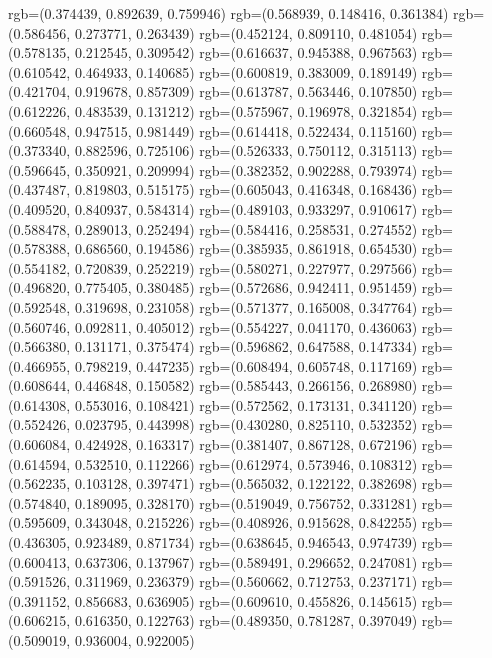 {{{					rgb=(0.374439, 0.892639, 0.759946)
					rgb=(0.568939, 0.148416, 0.361384)
					rgb=(0.586456, 0.273771, 0.263439)
					rgb=(0.452124, 0.809110, 0.481054)
					rgb=(0.578135, 0.212545, 0.309542)
					rgb=(0.616637, 0.945388, 0.967563)
					rgb=(0.610542, 0.464933, 0.140685)
					rgb=(0.600819, 0.383009, 0.189149)
					rgb=(0.421704, 0.919678, 0.857309)
					rgb=(0.613787, 0.563446, 0.107850)
					rgb=(0.612226, 0.483539, 0.131212)
					rgb=(0.575967, 0.196978, 0.321854)
					rgb=(0.660548, 0.947515, 0.981449)
					rgb=(0.614418, 0.522434, 0.115160)
					rgb=(0.373340, 0.882596, 0.725106)
					rgb=(0.526333, 0.750112, 0.315113)
					rgb=(0.596645, 0.350921, 0.209994)
					rgb=(0.382352, 0.902288, 0.793974)
					rgb=(0.437487, 0.819803, 0.515175)
					rgb=(0.605043, 0.416348, 0.168436)
					rgb=(0.409520, 0.840937, 0.584314)
					rgb=(0.489103, 0.933297, 0.910617)
					rgb=(0.588478, 0.289013, 0.252494)
					rgb=(0.584416, 0.258531, 0.274552)
					rgb=(0.578388, 0.686560, 0.194586)
					rgb=(0.385935, 0.861918, 0.654530)
					rgb=(0.554182, 0.720839, 0.252219)
					rgb=(0.580271, 0.227977, 0.297566)
					rgb=(0.496820, 0.775405, 0.380485)
					rgb=(0.572686, 0.942411, 0.951459)
					rgb=(0.592548, 0.319698, 0.231058)
					rgb=(0.571377, 0.165008, 0.347764)
					rgb=(0.560746, 0.092811, 0.405012)
					rgb=(0.554227, 0.041170, 0.436063)
					rgb=(0.566380, 0.131171, 0.375474)
					rgb=(0.596862, 0.647588, 0.147334)
					rgb=(0.466955, 0.798219, 0.447235)
					rgb=(0.608494, 0.605748, 0.117169)
					rgb=(0.608644, 0.446848, 0.150582)
					rgb=(0.585443, 0.266156, 0.268980)
					rgb=(0.614308, 0.553016, 0.108421)
					rgb=(0.572562, 0.173131, 0.341120)
					rgb=(0.552426, 0.023795, 0.443998)
					rgb=(0.430280, 0.825110, 0.532352)
					rgb=(0.606084, 0.424928, 0.163317)
					rgb=(0.381407, 0.867128, 0.672196)
					rgb=(0.614594, 0.532510, 0.112266)
					rgb=(0.612974, 0.573946, 0.108312)
					rgb=(0.562235, 0.103128, 0.397471)
					rgb=(0.565032, 0.122122, 0.382698)
					rgb=(0.574840, 0.189095, 0.328170)
					rgb=(0.519049, 0.756752, 0.331281)
					rgb=(0.595609, 0.343048, 0.215226)
					rgb=(0.408926, 0.915628, 0.842255)
					rgb=(0.436305, 0.923489, 0.871734)
					rgb=(0.638645, 0.946543, 0.974739)
					rgb=(0.600413, 0.637306, 0.137967)
					rgb=(0.589491, 0.296652, 0.247081)
					rgb=(0.591526, 0.311969, 0.236379)
					rgb=(0.560662, 0.712753, 0.237171)
					rgb=(0.391152, 0.856683, 0.636905)
					rgb=(0.609610, 0.455826, 0.145615)
					rgb=(0.606215, 0.616350, 0.122763)
					rgb=(0.489350, 0.781287, 0.397049)
					rgb=(0.509019, 0.936004, 0.922005)
}}}
